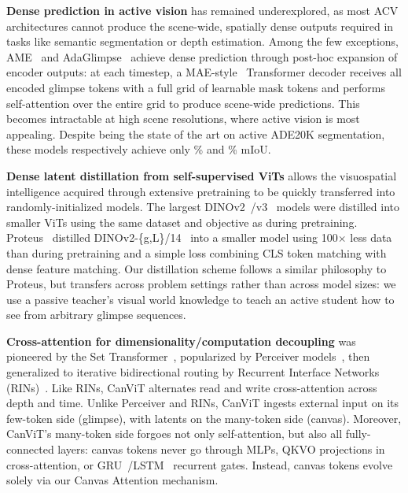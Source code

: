 \documentclass{article}
\begin{document}
\textbf{Dense prediction in active vision} has remained underexplored, as most \ac{ACV} architectures cannot produce the scene-wide, spatially dense outputs required in tasks like semantic segmentation or depth estimation.
Among the few exceptions, AME~\cite{AMEPardylRK0T23} and AdaGlimpse~\cite{pardylAdaGlimpseActiveVisual2025}
achieve dense prediction through post-hoc expansion of encoder outputs:
at each timestep, a MAE-style~\cite{heMaskedAutoencodersAre2022} Transformer decoder receives all encoded glimpse tokens
with a full grid of learnable mask tokens and performs self-attention over the entire grid to produce scene-wide predictions.
This becomes intractable at high scene resolutions, where active vision is most appealing.
Despite being the state of the art on active ADE20K segmentation,
these models respectively achieve only \ameSetrMiou\% and \adaglimpseEightMiou\% mIoU.

\textbf{Dense latent distillation from self-supervised \acsp{ViT}} allows the visuospatial intelligence acquired through extensive pretraining to be quickly transferred into randomly-initialized models.
The largest DINOv2~\cite{oquab2024dinov}/v3~\cite{simeoniDINOv32026}
models were distilled into smaller \acp{ViT}
using the same dataset and objective as during pretraining.
Proteus~\cite{zhang2025accessing}
distilled DINOv2-\{g,L\}/14~\cite{oquab2024dinov}
into a smaller model using 100$\times$ less data than during pretraining
and a simple loss combining CLS token matching with dense feature matching.
Our distillation scheme follows a similar philosophy to Proteus,
but transfers across problem settings rather than across model sizes:
we use a passive teacher's visual world knowledge to teach an active student
how to see from arbitrary glimpse sequences.

\textbf{Cross-attention for dimensionality/computation decoupling}
was pioneered by the Set Transformer~\cite{leeSetTransformerFramework2019},
popularized by Perceiver models~\cite{jaeglePerceiverGeneralPerception2021,jaeglePerceiverIOGeneral2021},
then generalized to iterative bidirectional routing by Recurrent Interface Networks (RINs)~\cite{jabriScalableAdaptiveComputation2023}.
Like RINs, CanViT alternates read and write cross-attention across depth and time.
Unlike Perceiver and RINs, CanViT ingests external input on its few-token side (glimpse), with latents on the many-token side (canvas).
Moreover, CanViT's many-token side forgoes not only self-attention, but also all fully-connected layers:
canvas tokens never go through \acp{MLP},
QKVO projections in cross-attention,
or GRU~\cite{chungEmpiricalEvaluationGated2014}/LSTM~\cite{hochreiterLongShortTermMemory1997} recurrent gates.
Instead, canvas tokens evolve solely via our Canvas Attention mechanism.
\end{document}
